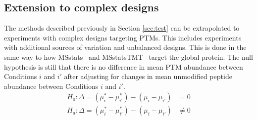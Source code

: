 \documentclass{mcp}
\begin{document}
%

\subsection{Extension to complex designs}
\label{sec:complex_methods}

The methods described previously in Section \ref{sec:test} can be extrapolated to experiments with complex designs targeting PTMs. This includes experiments with additional sources of variation and unbalanced designs. This is done in the same way to how MSstats~\cite{choi_etal_14a} and MSstatsTMT~\cite{Huang:2020} target the global protein. The null hypothesis is still that there is no difference in mean PTM abundance between Conditions $i$ and $i'$ after adjusting for changes in mean unmodified peptide abundance between Conditions $i$ and $i'$. 
\begin{align*}
H_{0}: \Delta = (\mu_{i}^{\ast} - \mu_{i'}^{\ast}) - (\mu_{i} - \mu_{i'}) &= 0 \\
H_{a}: \Delta = (\mu_{i}^{\ast} - \mu_{i'}^{\ast}) - (\mu_{i} - \mu_{i'}) &\neq 0
\end{align*}
\end{document}
